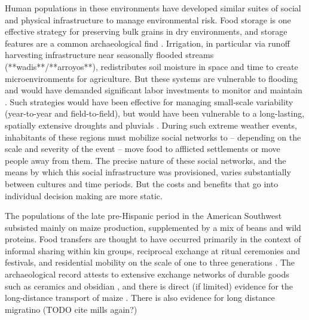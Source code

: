 \documentclass[fleqn,10pt]{wlscirep}
\begin{document}
Human populations in these environments have developed similar suites of social and physical infrastructure to manage environmental risk. Food storage is one effective strategy for preserving bulk grains in dry environments, and storage features are a common archaeological find \cite{Spielmann2011SustainableEnvironments}. Irrigation, in particular via runoff harvesting infrastructure near seasonally flooded streams (**wadis**/**arroyos**), redistributes soil moisture in space and time to create microenvironments for agriculture. But these systems are vulnerable to flooding and would have demanded significant labor investments to monitor and maintain \cite{Shaw1982, Dominguez2005,Beckers2013AncientAsia}. Such strategies would have been effective for managing small-scale variability (year-to-year and field-to-field), but would have been vulnerable to a long-lasting, spatially extensive droughts and pluvials \cite{Halstead1989}. During such extreme weather events, inhabitants of these regions must mobilize social networks to -- depending on the scale and severity of the event -- move food to afflicted settlements or move people away from them. The precise nature of these social networks, and the means by which this social infrastructure was provisioned, varies substantially between cultures and time periods. But the costs and benefits that go into individual decision making are more static.

The populations of the late pre-Hispanic period in the American Southwest subsisted mainly on maize production, supplemented by a mix of beans and wild proteins. Food transfers are thought to have occurred primarily in the context of informal sharing within kin groups, reciprocal exchange at ritual ceremonies and festivals, and residential mobility on the scale of one to three generations \cite{Hegmon1991,Hegmon1996,Kohler1996TheAnasazi,Varien1999SedentismBeyond,Cordell2007MesaMigration}. The archaeological record attests to extensive exchange networks of durable goods such as ceramics and obsidian \cite{Mills2013a}, and there is direct (if limited) evidence for the long-distance transport of maize \cite{Benson2009PossibleMexico,Benson2010WhoDrought}. There is also evidence for long distance migratino (TODO cite mills again?)
\end{document}
